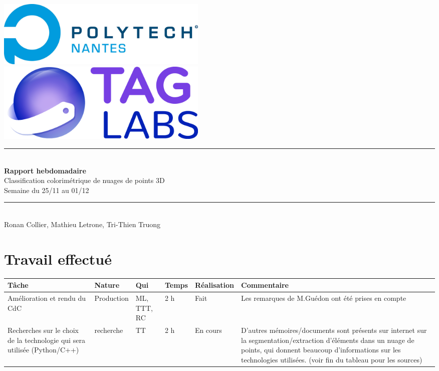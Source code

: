 \documentclass[12pt,titlepage,french]{article}
\begin{document}

\begin{titlepage}
\newcommand{\HRule}{\rule{\linewidth}{0.5mm}}
\center

  \includegraphics[width=0.45\textwidth]{../ressources/img_logos/logo_polytech.png}\\[1cm]
   
  \includegraphics[width=0.45\textwidth]{../ressources/img_logos/logo_taglabs.png}


\HRule \\[0.4cm]
{ \huge \bfseries Rapport hebdomadaire\\[0.15cm] }
Classification colorimétrique de nuages de points 3D\\
Semaine du 25/11 au 01/12
\HRule \\[1.5cm]
Ronan Collier,
Mathieu Letrone,
Tri-Thien Truong
\\[1cm]
\end{titlepage}

\section{Travail effectué}

\noindent\begin{tabularx}{17cm}{|p{2.5cm}|p{2.5cm}|p{1cm}|p{1.5cm}|p{2.5cm}|X|}
    \hline
    \textbf{Tâche} & \textbf{Nature} & \textbf{Qui} & \textbf{Temps} & \textbf{Réalisation} & \textbf{Commentaire} \\
    \hline
    Amélioration et rendu du CdC & Production & ML, TTT, RC & 2 h & Fait & Les remarques de M.Guédon ont été prises en compte\\
    \hline
    Recherches sur le choix de la technologie qui sera utilisée (Python/C++) & recherche & TT & 2 h & En cours & D'autres mémoires/documents sont présents sur internet sur la segmentation/extraction d'éléments dans un nuage de points, qui donnent beaucoup d'informations sur les technologies utilisées. (voir fin du tableau pour les sources)\\
    \hline
\end{tabularx} \\
\end{document}
